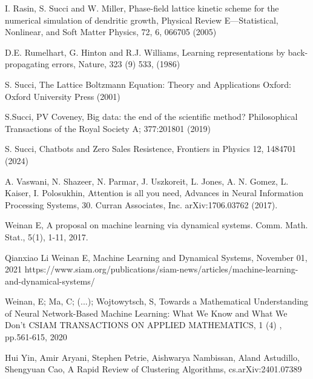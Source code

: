 \begin{thebibliography}{99}
 I. Rasin, S. Succi and W. Miller,
Phase-field lattice kinetic scheme for the numerical simulation of dendritic growth,
Physical Review E—Statistical, Nonlinear, and Soft Matter Physics,
72, 6, 066705 (2005)

 D.E. Rumelhart, G. Hinton and R.J. Williams,
Learning representations by back-propagating errors,
Nature, 323 (9) 533, (1986)

 S. Succi,
The Lattice Boltzmann Equation: Theory and Applications 
Oxford: Oxford University Press (2001)


 S.Succi, PV Coveney, 
Big data: the end of the scientific method? 
Philosophical Transactions of the Royal 
Society A; 377:201801 (2019)

 S. Succi,
Chatbots and Zero Sales Resistence, 
Frontiers in Physics 12, 1484701 (2024)

 A. Vaswani, N. Shazeer, N. Parmar, J. Uszkoreit, 
L. Jones, A. N. Gomez, L. Kaiser, I. Polosukhin,
Attention is all you need,
Advances in Neural Information Processing Systems, 30.
Curran Associates, Inc. arXiv:1706.03762 (2017).

 Weinan E, 
A proposal on machine learning via dynamical systems. Comm. Math. Stat., 5(1), 1-11, 2017.

 Qianxiao Li Weinan E, 
Machine Learning and Dynamical Systems, November 01, 2021
https://www.siam.org/publications/siam-news/articles/machine-learning-and-dynamical-systems/

 Weinan, E; Ma, C; (...); Wojtowytsch, S,
Towards a Mathematical Understanding of Neural Network-Based Machine Learning: What We Know and What We Don't
CSIAM TRANSACTIONS ON APPLIED MATHEMATICS, 1 (4) , pp.561-615, 2020

 Hui Yin, Amir Aryani, Stephen Petrie, Aishwarya Nambissan, Aland Astudillo, Shengyuan Cao,
A Rapid Review of Clustering Algorithms,
cs.arXiv:2401.07389

%
%



\end{thebibliography}
